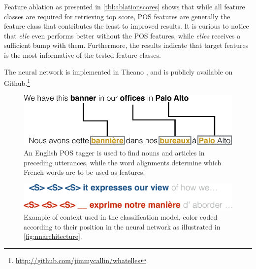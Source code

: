 \documentclass[11pt]{article}
\begin{document}
Feature ablation as presented in \cref{tbl:ablationscores} shows that while all feature classes are required for retrieving top score, POS features are generally the feature class that contributes the least to improved results. It is curious to notice that \emph{elle} even performs better without the POS features, while \emph{elles} receives a sufficient bump with them. Furthermore, the results indicate that target features is the most informative of the tested feature classes.

The neural network is implemented in Theano \cite{Bergstra2010Theano}, and is publicly available on Github.\footnote{\url{http://github.com/jimmycallin/whatelles}}

\begin{figure}[tbp]
    \centering
    \includegraphics[width=\columnwidth]{figures/posexample.pdf}
    \caption{An English POS tagger is used to find nouns and articles in preceding utterances, while the word alignments determine which French words are to be used as features.}
    \label{fig:posexample}
\end{figure}

\begin{figure}[tbp]
    \centering
    \includegraphics[width=\columnwidth]{figures/contextexample.pdf}
    \caption{Example of context used in the classification model, color coded according to their position in the neural network as illustrated in \cref{fig:nnarchitecture}.}
    \label{fig:contextexample}
\end{figure}
\end{document}
